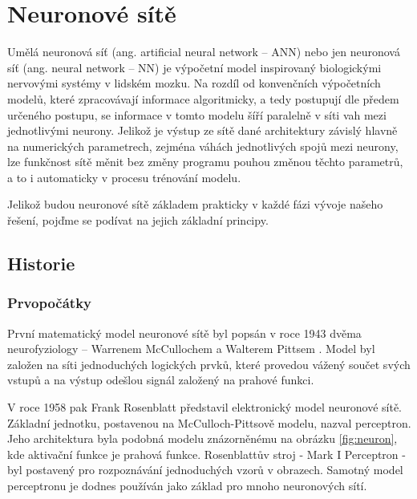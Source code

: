 \chapter{Neuronové sítě}
\label{chap:NN}

Umělá neuronová síť (ang. artificial neural network – ANN) nebo jen neuronová
síť (ang. neural network – NN) je výpočetní model inspirovaný biologickými
nervovými systémy v lidském mozku. Na rozdíl od konvenčních výpočetních modelů,
které zpracovávají informace algoritmicky, a tedy postupují dle předem určeného
postupu, se informace v tomto modelu šíří paralelně v síti vah mezi
jednotlivými neurony. Jelikož je výstup ze sítě dané architektury závislý
hlavně na numerických parametrech, zejména váhách jednotlivých spojů mezi
neurony, lze funkčnost sítě měnit bez změny programu pouhou změnou těchto
parametrů, a to i automaticky v procesu trénování modelu.

Jelikož budou neuronové sítě základem prakticky v každé fázi vývoje našeho
řešení, pojďme se podívat na jejich základní principy.

\section{Historie}
\label{sec:NN_History}

\subsection{Prvopočátky}
První matematický model neuronové sítě byl popsán v roce 1943 dvěma
neurofyziology – Warrenem McCullochem a Walterem Pittsem \cite{McCulloch1943}.
Model byl založen na síti jednoduchých logických prvků, které provedou vážený
součet svých vstupů a na výstup odešlou signál založený na prahové funkci.

V roce 1958 pak Frank Rosenblatt představil elektronický model neuronové sítě.
Základní jednotku, postavenou na McCulloch-Pittsově modelu, nazval perceptron.
\cite{Rosenblatt1958} Jeho architektura byla podobná modelu znázorněnému na
obrázku \ref{fig:neuron}, kde aktivační funkce je prahová funkce. Rosenblattův
stroj - Mark I Perceptron - byl postavený pro rozpoznávání jednoduchých vzorů v
obrazech.
Samotný model perceptronu je dodnes používán jako základ pro mnoho neuronových
sítí.


